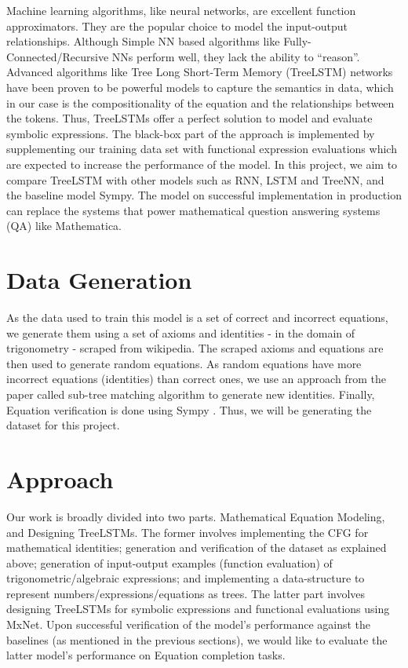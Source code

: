 \documentclass{article}
\begin{document}
\begin{normalsize}
    Machine learning algorithms, like neural networks, are excellent function approximators. They are the popular choice to model the input-output relationships. Although Simple NN based algorithms like Fully-Connected/Recursive NNs perform well,  they lack the ability to “reason”. Advanced algorithms like Tree Long Short-Term Memory (TreeLSTM) networks have been proven \cite{treelstm} to be powerful models to capture the semantics in data, which in our case is the compositionality of the equation and the relationships between the tokens. Thus, TreeLSTMs offer a perfect solution to model and evaluate symbolic expressions. The black-box part of the approach is implemented by supplementing our training data set with functional expression evaluations which are expected to increase the performance of the model.  In this project, we aim to compare TreeLSTM with other models such as RNN, LSTM and TreeNN, and the baseline model Sympy. The model on successful implementation in production can replace the systems that power mathematical question answering systems (QA) like Mathematica. 
    
\section{Data Generation}
        
As the data used to train this model is a set of correct and incorrect equations, we generate them using a set of axioms and identities - in the  domain of trigonometry - scraped from wikipedia. The scraped axioms and equations are then used to generate random equations. As random equations have more incorrect equations (identities) than correct ones, we use an approach from the paper called sub-tree matching algorithm to generate new identities. Finally, Equation verification is done using Sympy \cite{sympy}. Thus, we will be generating the dataset for this project.   

\section{Approach}

Our work is broadly divided into two parts. Mathematical Equation Modeling, and Designing TreeLSTMs. The former involves implementing the CFG for mathematical identities; generation and verification of the dataset as explained above; generation of input-output examples (function evaluation) of trigonometric/algebraic expressions; and implementing a data-structure to represent numbers/expressions/equations as trees. The latter part involves designing TreeLSTMs for symbolic expressions and functional evaluations using MxNet. Upon successful verification of the model’s performance against the baselines (as mentioned in the previous sections), we would like to evaluate the latter model’s performance on Equation completion tasks. 

\end{normalsize}
\end{document}
